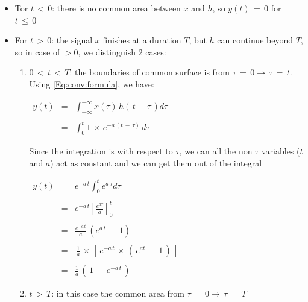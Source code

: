 \begin{itemize}

\item Tor $t \, < \, 0$: there is no common area between $x$ and $h$, so $y(t) \, = \, 0$ for $t \, \leq \, 0$

\item  For $t \, > \, 0$:  the signal $x$ finishes at a duration $T$, but $h$ can continue beyond $T$, so in case of $>0$, we distinguish 2 cases: 

    \begin{enumerate}
    \item $0 \,<\, t \, < \, T$:  the boundaries of common surface is from $\tau \, = \, 0 \rightarrow \, \tau \, = \, t$. Using \autoref{Eq:conv:formula}, we have:


$\begin{array}{rcl}
     y(t) &=& \displaystyle \int_{-\infty}^{+\infty} x(\tau) \, h\left(\,t \, - \tau\, \right) d \tau  \\ \\
      &=& \displaystyle \int_{0}^{t} 1 \, \times \, e^{-a \, (t \, - \, \tau)} \, d \tau
\end{array}$

Since the integration is with respect to $\tau$, we can all the non $\tau$ variables ($t$ and $a$) act as constant and we can get them out of the integral

\newpage
$\begin{array}{rcl}
 y(t) &=& e^{-a \, t} \displaystyle \int_{0}^{t} e^{a \, \tau} d\tau \,   \\ \\
    &=& e^{-a \, t}  \left[ \displaystyle\frac{e^{a\tau}}{a} \right]_{0}^{t} \\ \\ 
    &=& \displaystyle\frac{e^{-a \, t}}{a} \, (e^{a \, t} \, - \, 1) \\ \\ 
    &=& \, \displaystyle\frac{1}{a} \, \times \, \left[ \,e^{-a \, t} \, \times \, \left( \, e^{at} \, - \, 1 \,\right) \, \right] \\ \\
    &=& \displaystyle\frac{1}{a} \, \left(\, 1 \, - \, e^{-a \, t}   \, \right)
    
\end{array} $\\

\item  $t \, > \, T$: in this case the common area from $\tau \, = \, 0 \rightarrow \, \tau \, = \, T$


\end{enumerate}
\end{itemize}
